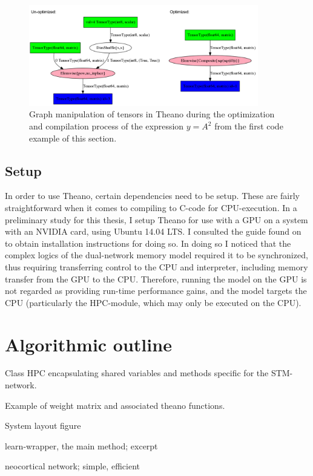 \begin{figure}
\centering
\includegraphics[width=10cm]{fig/unopt_opt_theano_graph}
\caption{Graph manipulation of tensors in Theano during the optimization and compilation process of the expression $y = A^2$ from the first code example of this section.}
\label{fig:theano_graph_demo}
\end{figure}

\subsection{Setup}

In order to use Theano, certain dependencies need to be setup. These are fairly straightforward when it comes to compiling to C-code for CPU-execution. In a preliminary study for this thesis, I setup Theano for use with a GPU on a system with an NVIDIA card, using Ubuntu 14.04 LTS. I consulted the guide found on \citep{LISA-lab2015b} to obtain installation instructions for doing so. In doing so I noticed that the complex logics of the dual-network memory model required it to be synchronized, thus requiring transferring control to the CPU and interpreter, including memory transfer from the GPU to the CPU. Therefore, running the model on the GPU is not regarded as providing run-time performance gains, and the model targets the CPU (particularly the HPC-module, which may only be executed on the CPU).

\section{Algorithmic outline}

Class HPC encapsulating shared variables and methods specific for the STM-network.

Example of weight matrix and associated theano functions.

System layout figure

learn-wrapper, the main method; excerpt

neocortical network; simple, efficient

